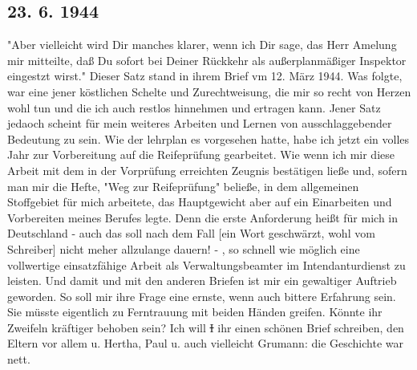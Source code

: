 \subsection{23. 6. 1944}

"Aber vielleicht wird Dir manches klarer, wenn ich Dir sage, das Herr Amelung mir mitteilte, da{\ss} Du sofort bei Deiner R\"{u}ckkehr als au{\ss}erplanm\"{a}{\ss}iger Inspektor eingestzt wirst."
Dieser Satz stand in ihrem Brief vm 12. M\"{a}rz 1944.
Was folgte, war eine jener k\"{o}stlichen Schelte und Zurechtweisung, die mir so recht von Herzen wohl tun und die ich auch restlos hinnehmen und ertragen kann.
Jener Satz jedaoch scheint f\"{u}r mein weiteres Arbeiten und Lernen von ausschlaggebender Bedeutung zu sein.
Wie der lehrplan es vorgesehen hatte, habe ich jetzt ein volles Jahr zur Vorbereitung auf die Reifepr\"{u}fung gearbeitet.
Wie wenn ich mir diese Arbeit mit dem in der Vorpr\"{u}fung erreichten Zeugnis best\"{a}tigen lie{\ss}e und, sofern man mir die Hefte, "Weg zur Reifepr\"{u}fung" belie{\ss}e, in dem allgemeinen Stoffgebiet f\"{u}r mich arbeitete, das Hauptgewicht aber auf ein Einarbeiten und Vorbereiten meines Berufes legte.
Denn die erste Anforderung hei{\ss}t f\"{u}r mich in Deutschland - auch das soll nach dem Fall {\color{red} [ein Wort geschw\"{a}rzt, wohl vom Schreiber] } nicht meher allzulange dauern! - , so schnell wie m\"{o}glich eine vollwertige einsatzf\"{a}hige Arbeit als Verwaltungsbeamter im Intendanturdienst zu leisten.
Und damit und mit den anderen Briefen ist mir ein gewaltiger Auftrieb geworden.
So soll mir ihre Frage eine ernste, wenn auch bittere Erfahrung sein.
Sie m\"{u}sste eigentlich zu Ferntrauung mit beiden H\"{a}nden greifen.
K\"{o}nnte ihr Zweifeln kr\"{a}ftiger behoben sein?
Ich will \st{I} ihr einen sch\"{o}nen Brief schreiben, den Eltern vor allem u. Hertha, Paul u. auch vielleicht Grumann: die Geschichte war nett.
\clearpage
